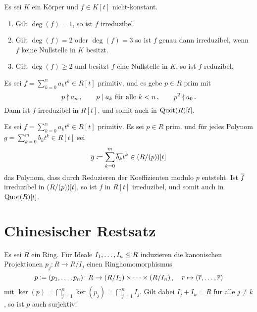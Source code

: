 \begin{lemma}
  Es sei $K$ ein Körper und $f \in K[t]$ nicht-konstant.
  \begin{enumerate}
    \item
      Gilt $\deg(f) = 1$, so ist $f$ irreduzibel.
    \item
      Gilt $\deg(f) = 2$ oder $\deg(f) = 3$ so ist $f$ genau dann irreduzibel, wenn $f$ keine Nullstelle in $K$ besitzt.
    \item
      Gilt $\deg(f) \geq 2$ und besitzt $f$ eine Nullstelle in $K$, so ist $f$ reduzibel.
  \end{enumerate}
\end{lemma}


\begin{proposition}[Eisenstein]
  Es sei $f = \sum_{k=0}^n a_k t^k \in R[t]$ primitiv, und es gebe $p \in R$ prim mit
  \[
    p \mathrel{\nmid} a_n \,,
    \qquad
    \text{$p \mathrel{|} a_k$ für alle $k < n$} \,,
    \qquad
    p^2 \mathrel{\nmid} a_0 \,.
  \]
  Dann ist $f$ irreduzibel in $R[t]$, und somit auch in $\operatorname{Quot}(R)[t]$.
\end{proposition}

\begin{proposition}[Reduktionskriterium]
  Es sei $f = \sum_{k=0}^n a_k t^k \in R[t]$ primitiv.
  Es sei $p \in R$ prim, und für jedes Polynom $g = \sum_{k=0}^m b_k t^k \in R[t]$ sei
  \[
              \overline{g}
    \coloneqq  \sum_{k=0}^m \overline{b_k} t^k
    \in       (R/(p))[t]
  \]
  das Polynom, dass durch Reduzieren der Koeffizienten modulo $p$ entsteht.
  Ist $\overline{f}$ irreduzibel in $(R/(p))[t]$, so ist $f$ in $R[t]$ irreduzibel, und somit auch in $\operatorname{Quot}(R)[t]$.
\end{proposition}







\section{Chinesischer Restsatz}

Es sei $R$ ein Ring.
Für Ideale $I_1, \dotsc, I_n \mathrel{\trianglelefteq} R$ induzieren die kanonischen Projektionen $p_j \colon R \to R/I_j$ einen Ringhomomorphismus
\[
            p
  \coloneqq  (p_1, \dotsc, p_n)
  \colon    R
  \to       (R/I_1) \times \dotsb \times (R/I_n) \,,
  \quad     r
  \mapsto   (\overline{r}, \dotsc, \overline{r})
\]
mit $\ker(p) = \bigcap_{j=1}^n \ker(p_j) = \bigcap_{j=1}^n I_j$.
Gilt dabei $I_j + I_k = R$ für alle $j \neq k$, so ist $p$ auch surjektiv:

